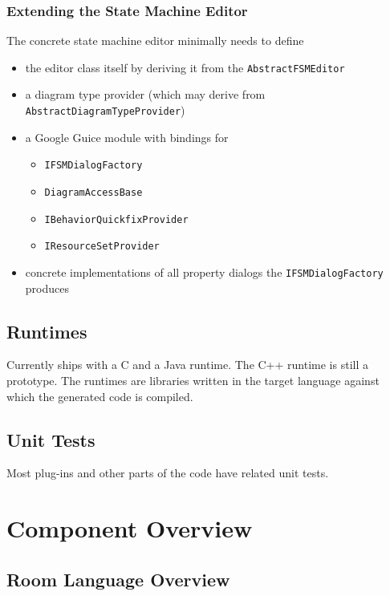 \subsubsection*{Extending the State Machine Editor}

The concrete state machine editor minimally needs to define
\begin{itemize}
\item the editor class itself by deriving it from the \texttt{AbstractFSMEditor}
\item a diagram type provider (which may derive from \texttt{AbstractDiagramTypeProvider})
\item a Google Guice module with bindings for
	\begin{itemize}
	\item \texttt{IFSMDialogFactory}
	\item \texttt{DiagramAccessBase}
	\item \texttt{IBehaviorQuickfixProvider}
	\item \texttt{IResourceSetProvider}
	\end{itemize}
\item concrete implementations of all property dialogs the \texttt{IFSMDialogFactory} produces
\end{itemize}


\subsection{Runtimes}

Currently \eTrice{} ships with a C and a Java runtime. The C++ runtime is still a prototype.
The runtimes are libraries written in the target 
language against which the generated code is compiled.

\subsection{Unit Tests}

Most plug-ins and other parts of the code have related unit tests.

\section{Component Overview}

\subsection{Room Language Overview}

